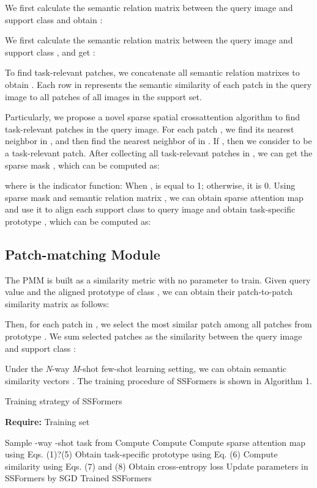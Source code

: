 \documentclass{SCIS2019}
\begin{document}
We first calculate the semantic relation matrix between the query image and support class  and obtain :

We first calculate the semantic relation matrix between the query image and support class , and get :


To find task-relevant patches, we concatenate all semantic relation matrixes  to obtain . Each row in  represents the semantic similarity of each patch in the query image to all patches of all images in the support set.

Particularly, we propose a novel sparse spatial crossattention algorithm to find task-relevant patches in the query image.
For each patch , we find its nearest neighbor  in , and then find the nearest neighbor  of  in . If , then we consider  to be a task-relevant patch. After collecting all task-relevant patches in , we can get the sparse mask , which can be computed as:

where  is the indicator function: When ,  is equal to 1; otherwise, it is 0. Using sparse mask  and semantic relation matrix , we can obtain sparse attention map  and use it to align each support class  to query image  and obtain task-specific prototype , which can be computed as:


\subsection{Patch-matching Module}
The PMM is built as a similarity metric with no parameter to train. Given query value  and the aligned prototype of class  , we can obtain their patch-to-patch similarity matrix as follows:
 
Then, for each patch in , we select the most similar patch among all patches from prototype . We sum  selected patches as the similarity between the query image and support class :

Under the \emph{N}-way \emph{M}-shot few-shot learning setting, we can obtain semantic similarity vectors . The training procedure of SSFormers is shown in Algorithm 1.

\begin{algorithm}[t]
	\caption{Training strategy of SSFormers}
	\textbf{Require:} Training set 
	\begin{algorithmic}[1] 
		\STATE Sample -way -shot task  from 
		\STATE Compute 
		\STATE Compute 
		\STATE Compute sparse attention map using Eqs. (1)?(5)
		\STATE Obtain task-specific prototype  using Eq. (6)
		\STATE Compute similarity  using Eqs. (7) and (8)
		\ENDFOR
		\STATE Obtain cross-entropy loss 
		\STATE Update parameters in SSFormers by SGD
		\ENDFOR
		\RETURN Trained SSFormers
	\end{algorithmic}
\end{algorithm}
\end{document}
